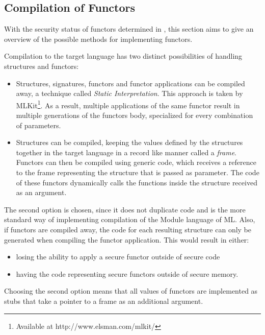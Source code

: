 \documentclass[10pt,a4paper,master=cws, masteroption=ai,english,inputenc=utf8]{kulemt}
\begin{document}
\subsection{Compilation of Functors\label{sec:FunctorCompilation}}
With the security status of functors determined in , %
this section aims to give an overview of the possible methods for implementing functors.

Compilation to the target language has two distinct possibilities of handling structures and functors:
\begin{itemize}
    \item Structures, signatures, functors and functor applications can be compiled away, a technique called \emph{Static Interpretation}.\cite{Elsman}
    This approach is taken by MLKit\footnote{Available at http://www.elsman.com/mlkit/}.
    As a result, multiple applications of the same functor result in multiple generations of the functors body, specialized for every combination of parameters.
    \item Structures can be compiled, keeping the values defined by the structures together in the target language in a record like manner called a \emph{frame}.
    Functors can then be compiled using generic code, which receives a reference to the frame representing the structure that is passed as parameter.
    The code of these functors dynamically calls the functions inside the structure received as an argument.
\end{itemize}

The second option is chosen, since it does not duplicate code and is the more standard way of implementing compilation of the Module language of ML.
Also, if functors are compiled away, the code for each resulting structure can only be generated when compiling the functor application.
This would result in either:
\begin{itemize}
\item losing the ability to apply a secure functor outside of secure code
\item having the code representing secure functors outside of secure memory.
\end{itemize}

\smallskip
Choosing the second option means that all values of functors are implemented as stubs that take a pointer to a frame as an additional argument.
\end{document}

